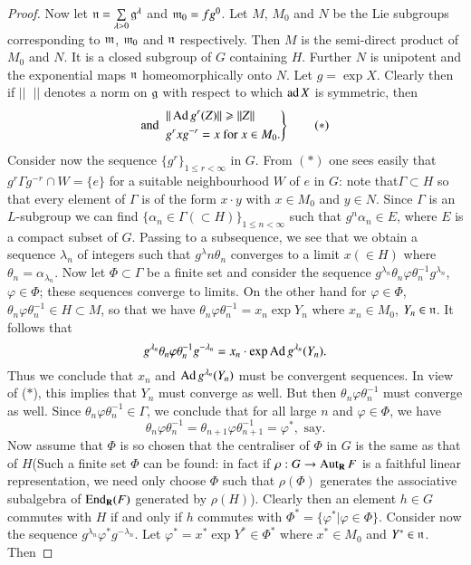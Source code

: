 \begin{proof}
Now let $\mathfrak{n} = \sum\limits_{\lambda > 0} \mathfrak{g}^{\lambda}$ and $\mathfrak{m}_0 = fg^0$. Let $M$, $M_0$ and $N$ be the Lie subgroups corresponding to $\mathfrak{m}$, $\mathfrak{m}_0$ and $\mathfrak{n}$ respectively. Then $M$ is the semi-direct product of $M_0$ and $N$. It is a closed subgroup of $G$ containing $H$. Further $N$ is unipotent and the exponential maps $\mathfrak{n}$ homeomorphically onto $N$. Let $g = \exp X$. Clearly then if $||\;\;||$ denotes a norm on $\mathfrak{g}$ with respect to which $\operatorname{ad} X$ is symmetric, then
\begin{equation*}
\text{and } 
\left.
\begin{aligned}
&|| \operatorname{Ad} g^r (Z) || \geqslant || Z||\\
& g^r x g^{-r} = x \text{ for } x \in M_0. 
\end{aligned}
\right\}
\tag*{$(\ast)$}
\end{equation*}
Consider now the sequence $\{g^r\}_{ 1 \leqslant r < \infty}$ in $G$. From $(\ast)$ one sees easily that $g^r \Gamma g^{-r} \cap W = \{e\}$ for a suitable neighbourhood $W$ of $e$ in $G$: note that\pageoriginale $\Gamma \subset H$ so that every element of $\Gamma$ is of the form $x \cdot y$ with $x \in M_0$ and $y \in N$. Since $\Gamma$ is an $L$-subgroup we can find $\{\alpha_n \in \Gamma (\subset H)\}_{1 \leqslant n < \infty}$ such that $g^n \alpha_n \in E$, where $E$ is a compact subset of $G$. Passing to a subsequence, we see that we obtain a sequence $\lambda_n$ of integers such that $g^\lambda n \theta_n$ converges to a limit $x (\in H)$ where $\theta_n = \alpha_{\lambda_n}$. Now let $\Phi \subset \Gamma$ be a finite set and consider the sequence $g^{\lambda_n} \theta_n \varphi \theta^{-1}_n g^{\lambda_n}$, $\varphi \in \Phi$; these sequences converge to limits. On the other hand for $\varphi \in \Phi$, $\theta_n \varphi \theta^{-1}_n \in H \subset M$, so that we have $\theta_n \varphi \theta^{-1}_n = x_n \exp Y_n $ where $x_n \in M_0$, $Y_n \in \mathfrak{n}$. It follows that 
$$
g^{\lambda_n} \theta_n \varphi \theta^{-1}_n g^{-\lambda_n} = x_n \cdot \exp \operatorname{Ad} g^{\lambda_n} (Y_n).
$$
Thus we conclude that $x_n$ and $\operatorname{Ad} g^{\lambda_n} (Y_n)$ must be convergent sequences. In view of ($\ast$), this implies that $Y_n$ must converge as well. But then $\theta_n \varphi \theta^{-1}_n$ must converge as well. Since $\theta_n \varphi \theta^{-1}_n \in \Gamma$, we conclude that for all large $n$ and $\varphi \in \Phi$, we have
$$
\theta_n \varphi \theta^{-1}_n = \theta_{n+1} \varphi \theta^{-1}_{n+1} = \varphi^\ast, \text{ say.}
$$
Now assume that $\Phi$ is so chosen that the centraliser of $\Phi$ in $G$ is the same as that of $H$(Such a finite set $\Phi$ can be found: in fact if $\rho : G \to \operatorname{Aut}_{\mathbf{R}} F$ is a faithful linear representation, we need only choose $\Phi$ such that $\rho (\Phi)$ generates the associative subalgebra of $\operatorname{End}_{\mathbf{R}} (F)$ generated by $\rho (H)$). Clearly then an element $h \in G$ commutes with $H$ if and only if $h$ commutes with $\Phi^\ast = \{\varphi^\ast \big| \varphi \in\Phi\}$. Consider now the sequence $g^{\lambda_n}\varphi^\ast g^{-\lambda_n}$. Let $\varphi^\ast = x^\ast \exp Y^\ast \in \Phi^\ast$ where $x^\ast \in M_0$ and $Y^\ast \in \mathfrak{n}$. Then

\end{proof}

